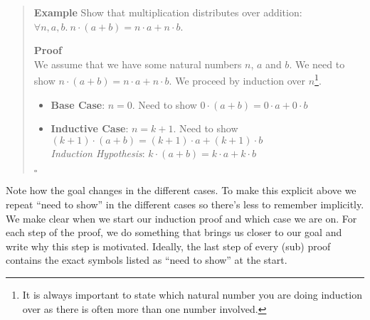 \documentclass{tufte-handout}
\newcounter{example}
\newenvironment{example}
{\refstepcounter{example}\begin{quote}
\textbf{Example \arabic{example}}}
{

$\square$\end{quote}}
\begin{document}
\begin{example}\label{ex:distr}
  Show that multiplication distributes over addition:
  $\forall n,a,b.~n\cdot(a+b) = n\cdot a + n\cdot b$.

  \textbf{Proof}\\
  We assume that we have some natural numbers $n$, $a$ and $b$.
  We need to show $n\cdot(a+b) = n\cdot a + n\cdot b$.
  We proceed by induction over $n$\footnote{It is always important
    to state which natural number you are doing induction over as
    there is often more than one number involved. }.
  \begin{itemize}
  \item \textbf{Base Case}: $n = 0$. Need to show $0 \cdot (a + b) = 0 \cdot a + 0 \cdot b$
  \item \textbf{Inductive Case}: $n = k + 1$. Need to show
    $(k + 1) \cdot (a + b) = (k + 1) \cdot a + (k + 1) \cdot b$\\
    \textit{Induction Hypothesis}: $k \cdot (a + b) = k \cdot a + k \cdot b$
  \end{itemize}
\end{example}

Note how the goal changes in the different cases. To make this
explicit above we repeat ``need to show'' in the different cases
so there's less to remember implicitly.
%
We make clear when we start our induction proof and which case we
are on. For each step of the proof, we do something that brings us
closer to our goal and write why this step is motivated. Ideally,
the last step of every (sub) proof contains the exact symbols
listed as ``need to show'' at the start.
\end{document}
